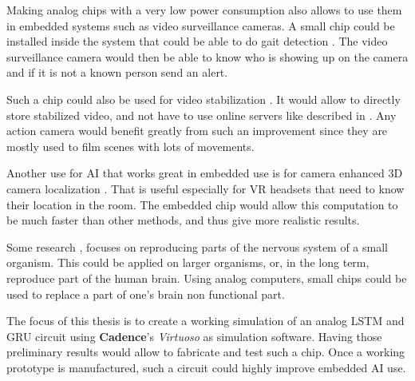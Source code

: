Making analog chips with a very low power consumption also allows to use them in embedded systems such as video surveillance cameras. A small chip could be installed inside the system that could be able to do gait detection \cite{gaitDS,gaitDig,gait}. The video surveillance camera would then be able to know who is showing up on the camera and if it is not a known person send an alert.

Such a chip could also be used for video stabilization \cite{videoStab}. It would allow to directly store stabilized video, and not have to use online servers like described in \cite{videoStab}. Any action camera would benefit greatly from such an improvement since they are mostly used to film scenes with lots of movements.

Another use for \ac{AI} that works great in embedded use is for camera enhanced 3D camera localization \cite{videoReloc}. That is useful especially for \ac{VR} headsets that need to know their location in the room. The embedded chip would allow this computation to be much faster than other methods, and thus give more realistic results.

Some research \cite{celegans}, focuses on reproducing parts of the nervous system of a small organism. This could be applied on larger organisms, or, in the long term, reproduce part of the human brain. Using analog computers, small chips could be used to replace a part of one's brain non functional part.

The focus of this thesis is to create a working simulation of an analog \ac{LSTM} and \ac{GRU} circuit using \textbf{Cadence}'s \textit{Virtuoso} as simulation software. Having those preliminary results would allow to fabricate and test such a chip. Once a working prototype is manufactured, such a circuit could highly improve embedded \ac{AI} use.
